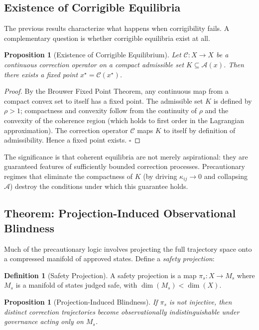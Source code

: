 \documentclass[11pt,a4paper]{article}
\theoremstyle{definition}
\newtheorem{definition}{Definition}
\theoremstyle{plain}
\newtheorem{proposition}[theorem]{Proposition}
\begin{document}
\begin{mdframed}[style=appendixbox]
\subsection{Existence of Corrigible Equilibria}

The previous results characterize what happens when corrigibility fails. A complementary question is whether corrigible equilibria exist at all.

\begin{proposition}[Existence of Corrigible Equilibrium]
Let $\mathcal{C} : X \to X$ be a continuous correction operator on a compact admissible set $K \subseteq \mathcal{A}(x)$. Then there exists a fixed point $x^\star = \mathcal{C}(x^\star)$.
\end{proposition}

\begin{proof}
By the Brouwer Fixed Point Theorem, any continuous map from a compact convex set to itself has a fixed point. The admissible set $K$ is defined by $\rho > 1$; compactness and convexity follow from the continuity of $\rho$ and the convexity of the coherence region (which holds to first order in the Lagrangian approximation). The correction operator $\mathcal{C}$ maps $K$ to itself by definition of admissibility. Hence a fixed point exists. $\square$
\end{proof}

The significance is that coherent equilibria are not merely aspirational: they are guaranteed features of sufficiently bounded correction processes. Precautionary regimes that eliminate the compactness of $K$ (by driving $\kappa_{ij} \to 0$ and collapsing $\mathcal{A}$) destroy the conditions under which this guarantee holds.

\subsection{Theorem: Projection-Induced Observational Blindness}

Much of the precautionary logic involves projecting the full trajectory space onto a compressed manifold of approved states. Define a \emph{safety projection}:

\begin{definition}[Safety Projection]
A safety projection is a map $\pi_s : X \to M_s$ where $M_s$ is a manifold of states judged safe, with $\dim(M_s) < \dim(X)$.
\end{definition}

\begin{proposition}[Projection-Induced Blindness]
If $\pi_s$ is not injective, then distinct correction trajectories become observationally indistinguishable under governance acting only on $M_s$.
\end{proposition}


\end{mdframed}
\end{document}
